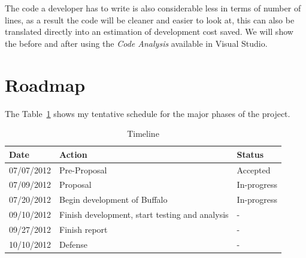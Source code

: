 The code a developer has to write is also considerable less in terms of number of lines, as a result the code will be cleaner and easier to look at, this can also be translated directly into an estimation of development cost saved. We will show the before and after using the {\em Code Analysis} available in Visual Studio.

\section{Roadmap}
The Table~\ref{tab:roadmap_tbl} shows my tentative schedule for the major phases of the project.

\begin{table}[h]
\centering
\begin{tabular}{|l|l|l|}
\hline
Date & Action & Status\\
\hline
07/07/2012 & Pre-Proposal & Accepted\\
07/09/2012 & Proposal & In-progress\\
07/20/2012 & Begin development of Buffalo & In-progress\\
09/10/2012 & Finish development, start testing and analysis & - \\
09/27/2012 & Finish report & - \\
10/10/2012 & Defense & - \\
\hline
\end{tabular}
\caption{Timeline}
\label{tab:roadmap_tbl}
\end{table}



\singlespacing




